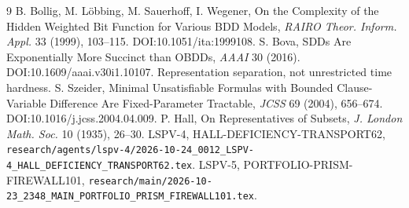 \documentclass[11pt]{article}
\begin{document}
\begin{thebibliography}{9}
 B. Bollig, M. L\"obbing, M. Sauerhoff, I. Wegener, On the Complexity of the Hidden Weighted Bit Function for Various BDD Models, \emph{RAIRO Theor. Inform. Appl.} 33 (1999), 103--115. DOI:10.1051/ita:1999108.
 S. Bova, SDDs Are Exponentially More Succinct than OBDDs, \emph{AAAI} 30 (2016). DOI:10.1609/aaai.v30i1.10107. Representation separation, not unrestricted time hardness.
 S. Szeider, Minimal Unsatisfiable Formulas with Bounded Clause-Variable Difference Are Fixed-Parameter Tractable, \emph{JCSS} 69 (2004), 656--674. DOI:10.1016/j.jcss.2004.04.009.
 P. Hall, On Representatives of Subsets, \emph{J. London Math. Soc.} 10 (1935), 26--30.
 LSPV-4, HALL-DEFICIENCY-TRANSPORT62, \texttt{research/agents/lspv-4/2026-10-24\_0012\_LSPV-4\_HALL\_DEFICIENCY\_TRANSPORT62.tex}.
 LSPV-5, PORTFOLIO-PRISM-FIREWALL101, \texttt{research/main/2026-10-23\_2348\_MAIN\_PORTFOLIO\_PRISM\_FIREWALL101.tex}.
\end{thebibliography}
\end{document}
